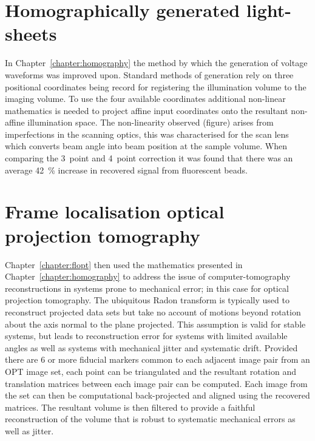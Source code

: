 \section{Homographically generated light-sheets}
In Chapter~\ref{chapter:homography} the method by which the generation of voltage waveforms was improved upon.
Standard methods of generation rely on three positional coordinates being record for registering the illumination volume to the imaging volume.
To use the four available coordinates additional non-linear mathematics is needed to project affine input coordinates onto the resultant non-affine illumination space.
The non-linearity observed (figure) arises from imperfections in the scanning optics, this was characterised for the scan lens which converts beam angle into beam position at the sample volume.
When comparing the 3~point and 4~point correction it was found that there was an average \SI{42}{\percent} increase in recovered signal from fluorescent beads.

\section{Frame localisation optical projection tomography}
Chapter~\ref{chapter:flopt} then used the mathematics presented in Chapter~\ref{chapter:homography} to address the issue of computer-tomography reconstructions in systems prone to mechanical error; in this case for optical projection tomography.
The ubiquitous Radon transform is typically used to reconstruct projected data sets but take no account of motions beyond rotation about the axis normal to the plane projected.
This assumption is valid for stable systems, but leads to reconstruction error for systems with limited available angles as well as systems with mechanical jitter and systematic drift.
Provided there are 6 or more fiducial markers common to each adjacent image pair from an \gls{OPT} image set, each point can be triangulated and the resultant rotation and translation matrices between each image pair can be computed.
Each image from the set can then be computational back-projected and aligned using the recovered matrices.
The resultant volume is then filtered to provide a faithful reconstruction of the volume that is robust to systematic mechanical errors as well as jitter.

